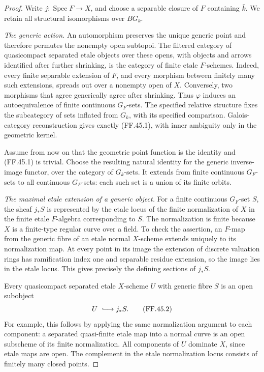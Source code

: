 \begin{proof}
Write \(j:\operatorname{Spec}F\to X\), and choose a
separable closure of \(F\) containing \(\bar k\).
We retain all structural isomorphisms over \(BG_k\).

\emph{The generic action.}
An automorphism preserves the unique generic point and
therefore permutes the nonempty open subtopoi. The filtered
category of quasicompact separated etale objects over
these opens, with objects and arrows identified after
further shrinking, is the category of finite etale
\(F\)-schemes. Indeed, every finite separable extension
of \(F\), and every morphism between finitely many such
extensions, spreads out over a nonempty open of \(X\).
Conversely, two morphisms that agree generically agree
after shrinking. Thus \(\varphi\) induces an
autoequivalence of finite continuous \(G_F\)-sets.
The specified relative structure fixes the subcategory
of sets inflated from \(G_k\), with its specified
comparison. Galois-category reconstruction gives exactly
(FF.45.1), with inner ambiguity only in the geometric
kernel.

Assume from now on that the geometric point function is
the identity and (FF.45.1) is trivial. Choose the resulting
natural identity for the generic inverse-image functor,
over the category of \(G_k\)-sets. It extends from finite
continuous \(G_F\)-sets to all continuous \(G_F\)-sets:
each such set is a union of its finite orbits.

\emph{The maximal etale extension of a generic object.}
For a finite continuous \(G_F\)-set \(S\), the sheaf
\(j_*S\) is represented by the etale locus of the finite
normalization of \(X\) in the finite etale \(F\)-algebra
corresponding to \(S\). The normalization is finite
because \(X\) is a finite-type regular curve over a
field. To check the assertion, an \(F\)-map from the
generic fibre of an etale normal \(X\)-scheme extends
uniquely to its normalization map. At every point in its
image the extension of discrete valuation rings has
ramification index one and separable residue extension,
so the image lies in the etale locus. This gives precisely
the defining sections of \(j_*S\).

Every quasicompact separated etale \(X\)-scheme \(U\)
with generic fibre \(S\) is an open subobject
\[
                           U\ \lhook\joinrel\longrightarrow j_*S.
                                                        \tag{FF.45.2}
\]
For example, this follows by applying the same
normalization argument to each component: a separated
quasi-finite etale map into a normal curve is an open
subscheme of its finite normalization. All components of
\(U\) dominate \(X\), since etale maps are open.
The complement in the etale normalization locus consists
of finitely many closed points.


\end{proof}
